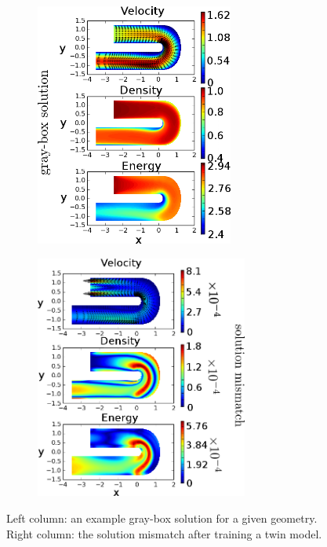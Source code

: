 \begin{figure}[htbp]\begin{center}
    \begin{subfigure}[t]{.49\textwidth}
        \centering
        \includegraphics[height=8cm]{../graysol_Ubend.png}
        \label{fig: graysol Ubend}
    \end{subfigure}
    \begin{subfigure}[t]{.49\textwidth}
        \centering
        \includegraphics[height=8cm]{../err_Ubend.png}
        \label{fig: errsol Ubend}
    \end{subfigure}
    \caption{Left column: an example gray-box solution for a given geometry. Right column:
             the solution mismatch after training a twin model.}
    \label{fig: grayErrSol Ubend}
\end{center}\end{figure}



